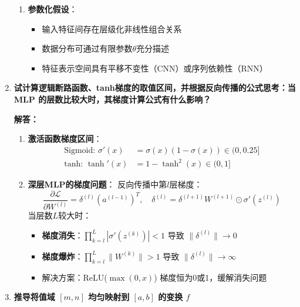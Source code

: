 \documentclass[a4paper,12pt]{book}
\begin{document}
\begin{enumerate}[label=\arabic*.]
\begin{enumerate}
        \item \textbf{参数化假设}：
        \begin{itemize}
            \item 输入特征间存在层级化非线性组合关系
            \item 数据分布可通过有限参数$\theta$充分描述
            \item 特征表示空间具有平移不变性（CNN）或序列依赖性（RNN）
        \end{itemize}
    \end{enumerate}
    
    \item \textbf{试计算逻辑断路函数、tanh梯度的取值区间，并根据反向传播的公式思考：当 MLP 的层数比较大时，其梯度计算公式有什么影响？}
    
    \textbf{解答：}
    \begin{enumerate}
        \item \textbf{激活函数梯度区间}：
        \begin{align*}
        \text{Sigmoid: } \sigma'(x) &= \sigma(x)(1-\sigma(x)) \in (0, 0.25] \\
        \text{tanh: } \tanh'(x) &= 1 - \tanh^2(x) \in (0, 1]
        \end{align*}
        
        \item \textbf{深层MLP的梯度问题}：
        反向传播中第$l$层梯度：
        \[
        \frac{\partial \mathcal{L}}{\partial W^{(l)}} = \delta^{(l)} (a^{(l-1)})^T, \quad 
        \delta^{(l)} = \delta^{(l+1)} W^{(l+1)} \odot \sigma'(z^{(l)})
        \]
        当层数$L$较大时：
        \begin{itemize}
            \item \textbf{梯度消失}：$\prod_{k=l}^{L} |\sigma'(z^{(k)})| < 1$ 导致 $\|\delta^{(l)}\| \rightarrow 0$
            \item \textbf{梯度爆炸}：$\prod_{k=l}^{L} \|W^{(k)}\| > 1$ 导致 $\|\delta^{(l)}\| \rightarrow \infty$
            \item 解决方案：ReLU($\max(0,x)$) 梯度恒为0或1，缓解消失问题
        \end{itemize}
    \end{enumerate}
    
    \item \textbf{推导将值域 $[m, n]$ 均匀映射到 $[a, b]$ 的变换 $f$}
    

\end{enumerate}
\end{document}
